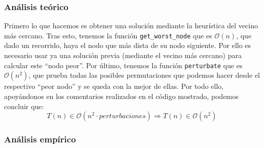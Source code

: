 \documentclass[10pt,a4paper]{article}
\begin{document}
\subsubsection*{Análisis teórico}

Primero lo que hacemos es obtener una solución mediante la heurística del vecino más cercano. Tras esto, tenemos la función \texttt{get\_worst\_node} que es \(\mathcal{O}(n)\), que dado un recorrido, haya el nodo que más dista de su nodo siguiente. Por ello es necesario usar ya una solución previa (mediante el vecino más cercano) para calcular este ``nodo peor''. Por último, tenemos la función \texttt{perturbate} que es \(\mathcal{O}(n^2)\), que prueba todas las posibles permutaciones que podemos hacer desde el respectivo ``peor nodo'' y se queda con la mejor de ellas. Por todo ello, apoyándonos en los comentarios realizados en el código mostrado, podemos concluir que:
\[
	T(n) \in \mathcal{O}(n^2 \cdot perturbaciones) \Rightarrow T(n) \in \mathcal{O}(n^2)
\]

\subsubsection*{Análisis empírico}
\end{document}
